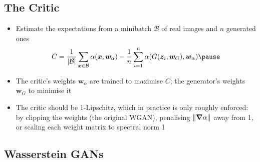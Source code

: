 \begin{slide}
\section[-1]{The Critic}

\begin{PauseHighLight}
  \begin{itemize}
  \item Estimate the expectations from a minibatch $\mathcal{B}$ of real
    images and $n$ generated ones
    \begin{align*}
      C = \frac{1}{|\mathcal{B}|} \sum_{\bm{x}\in\mathcal{B}} \alpha(\bm{x},\bm{w}_\alpha) -
      \frac{1}{n} \sum_{i=1}^n \alpha(G(\bm{z}_i,\bm{w}_G),\bm{w}_\alpha)\pause
    \end{align*}
  \item The critic's weights $\bm{w}_\alpha$ are trained to maximise $C$;
    the generator's weights $\bm{w}_G$ to minimise it\pause
  \item The critic should be 1-Lipschitz, which in practice is only
    roughly enforced: by clipping the weights (the original WGAN),
    penalising $\|\bm{\nabla}\alpha\|$ away from 1, or scaling each weight
    matrix to spectral norm 1\pause
  \end{itemize}
\end{PauseHighLight}

\end{slide}


\begin{slide}
\section{Wasserstein GANs}

\pb\pause{}
\begin{center}
  \pause
\end{center}
\end{slide}


